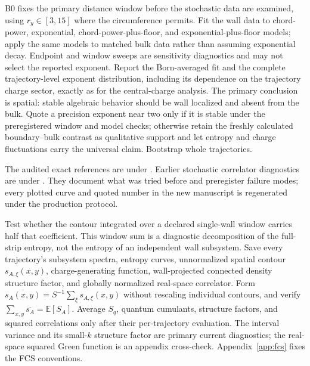 \documentclass[aps,prx,twocolumn,floatfix,nofootinbib,superscriptaddress,longbibliography]{revtex4-2}
\newcommand{\E}{\mathbb{E}}
\begin{document}
B0 fixes the primary distance window before the stochastic data are examined, using
$r_y\in[3,15]$ where the circumference permits.  Fit the wall data to chord-power,
exponential, chord-power-plus-floor, and exponential-plus-floor models; apply the same
models to matched bulk data rather than assuming exponential decay.  Endpoint and window
sweeps are sensitivity diagnostics and may not select the reported exponent.  Report the
Born-averaged fit and the complete trajectory-level exponent distribution, including its
dependence on the trajectory charge sector, exactly as for the central-charge analysis.
The primary conclusion is spatial: stable algebraic behavior should be wall localized and
absent from the bulk.  Quote a precision exponent near two only if it is stable under the
preregistered window and model checks; otherwise retain the freshly calculated
boundary--bulk contrast as qualitative support and let entropy and charge fluctuations
carry the universal claim.  Bootstrap whole trajectories.

The audited exact references are under .  Earlier stochastic
correlator diagnostics are under .  They
document what was tried before and preregister failure modes; every plotted curve and
quoted number in the new manuscript is regenerated under the production protocol.

Test whether the contour integrated over a declared single-wall window carries half
that coefficient.  This window sum is a diagnostic decomposition of the full-strip
entropy, not the entropy of an independent wall subsystem.  Save every trajectory's
subsystem spectra, entropy curves, unnormalized spatial contour
$s_{A,\xi}(x,y)$, charge-generating function, wall-projected connected density structure
factor, and globally normalized real-space correlator.  Form
$\overline{s_A(x,y)}=S^{-1}\sum_\xi s_{A,\xi}(x,y)$ without rescaling individual
contours, and verify $\sum_{x,y}\overline{s_A}=\E[S_A]$.  Average $S_q$, quantum
cumulants, structure factors, and squared correlations only after their per-trajectory
evaluation.  The interval variance and its small-$k$ structure factor are primary current
diagnostics; the real-space squared Green function is an appendix cross-check.
Appendix~\ref{app:fcs} fixes the FCS conventions.
\end{document}
